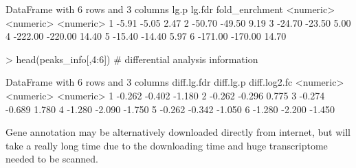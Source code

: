 \documentclass[]{article}
\begin{document}
\begin{Schunk}
\begin{Soutput}
DataFrame with 6 rows and 3 columns
       lg.p    lg.fdr fold_enrchment
  <numeric> <numeric>      <numeric>
1     -5.91     -5.05           2.47
2    -50.70    -49.50           9.19
3    -24.70    -23.50           5.00
4   -222.00   -220.00          14.40
5    -15.40    -14.40           5.97
6   -171.00   -170.00          14.70
\end{Soutput}
\begin{Sinput}
> head(peaks_info[,4:6]) # differential analysis information
\end{Sinput}
\begin{Soutput}
DataFrame with 6 rows and 3 columns
  diff.lg.fdr diff.lg.p diff.log2.fc
    <numeric> <numeric>    <numeric>
1      -0.262    -0.402       -1.180
2      -0.262    -0.296        0.775
3      -0.274    -0.689        1.780
4      -1.280    -2.090       -1.750
5      -0.262    -0.342       -1.050
6      -1.280    -2.200       -1.450
\end{Soutput}
\end{Schunk}



Gene annotation may be alternatively downloaded directly from internet, but will take a really long time due to the downloading time and huge transcriptome needed to be scanned.
\end{document}
